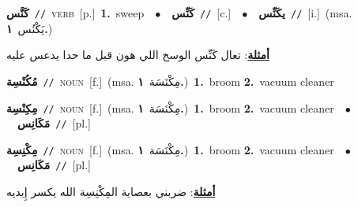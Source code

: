 \documentclass[10pt,a4paper,twoside]{article} %
\begin{document}
\begin{multicols}{2}
{\setlength\topsep{0pt}\textbf{\foreignlanguage{arabic}{كَنَّس}}\ {\color{gray}\texttt{//}\color{black}}\ \textsc{verb}\ [p.]\ \textbf{1.}~sweep\ \ $\bullet$\ \ \setlength\topsep{0pt}\textbf{\foreignlanguage{arabic}{كَنِّس}}\ {\color{gray}\texttt{//}\color{black}}\ [c.]\ \ $\bullet$\ \ \setlength\topsep{0pt}\textbf{\foreignlanguage{arabic}{يكَنِّس}}\ {\color{gray}\texttt{//}\color{black}}\ [i.]\ \color{gray}(msa. \foreignlanguage{arabic}{يَكْنُس}~\foreignlanguage{arabic}{\textbf{١.}})\color{black}\  \begin{flushright}\color{gray}\foreignlanguage{arabic}{\textbf{\underline{\foreignlanguage{arabic}{أمثلة}}}: تعال كَنِّس الوسخ اللي هون قبل ما حدا يدعس عليه}\end{flushright}\color{black}} \vspace{2mm}

{\setlength\topsep{0pt}\textbf{\foreignlanguage{arabic}{مُكُنْسِة}}\ {\color{gray}\texttt{//}\color{black}}\ \textsc{noun}\ [f.]\ \color{gray}(msa. \foreignlanguage{arabic}{مِكْنَسَة}~\foreignlanguage{arabic}{\textbf{١.}})\color{black}\ \textbf{1.}~broom  \textbf{2.}~vacuum cleaner\ } \vspace{2mm}

{\setlength\topsep{0pt}\textbf{\foreignlanguage{arabic}{مِكِنْسِة}}\ {\color{gray}\texttt{//}\color{black}}\ \textsc{noun}\ [f.]\ \color{gray}(msa. \foreignlanguage{arabic}{مِكْنَسَة}~\foreignlanguage{arabic}{\textbf{١.}})\color{black}\ \textbf{1.}~broom  \textbf{2.}~vacuum cleaner\ \ $\bullet$\ \ \setlength\topsep{0pt}\textbf{\foreignlanguage{arabic}{مَكَانِس}}\ {\color{gray}\texttt{//}\color{black}}\ [pl.]\ } \vspace{2mm}

{\setlength\topsep{0pt}\textbf{\foreignlanguage{arabic}{مِكْنِسِة}}\ {\color{gray}\texttt{//}\color{black}}\ \textsc{noun}\ [f.]\ \color{gray}(msa. \foreignlanguage{arabic}{مِكْنَسَة}~\foreignlanguage{arabic}{\textbf{١.}})\color{black}\ \textbf{1.}~broom  \textbf{2.}~vacuum cleaner\ \ $\bullet$\ \ \setlength\topsep{0pt}\textbf{\foreignlanguage{arabic}{مَكَانِس}}\ {\color{gray}\texttt{//}\color{black}}\ [pl.]\  \begin{flushright}\color{gray}\foreignlanguage{arabic}{\textbf{\underline{\foreignlanguage{arabic}{أمثلة}}}: ضربني بعصاية المِكْنِسِة الله يكسر إِيديه}\end{flushright}\color{black}} \vspace{2mm}


\end{multicols}
\end{document}
